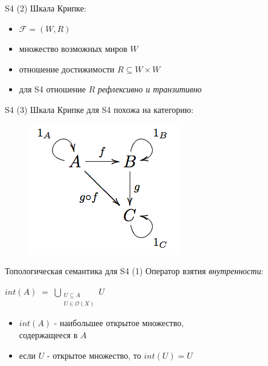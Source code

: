 \documentclass{beamer}
\begin{document}
\begin{frame}{S4 (2)}
Шкала Крипке:\\
\bigskip
\begin{itemize}
	\item $\mathcal{F} = (W, R)$
	\item множество возможных миров $W$
	\item отношение достижимости $R \subseteq W \times W$
	\item для S4 отношение $R$ \textit{рефлексивно и транзитивно}
\end{itemize}
\end{frame}

\begin{frame}{S4 (3)}
Шкала Крипке для S4 похожа на категорию:\\
\bigskip
\begin{center}
	\begin{figure}[H]
		\includegraphics[scale=0.6]{basic_category.png} 
	\end{figure}
\end{center}
\end{frame}

\begin{frame}{Топологическая семантика для S4 (1)}
Оператор взятия \textit{внутренности}:\\
\bigskip
\begin{center}
	    $\displaystyle int(A) \; = \; \bigcup_{\substack{U \subseteq A\\U \in \mathcal{O}(X)}}{U}$
\end{center}
\bigskip
\begin{itemize}
	\item $int(A)$ - наибольшее открытое множество, \\содержащееся в $A$
	\item если $U$ - открытое множество, то $int(U) = U$
\end{itemize}
\end{frame}
\end{document}
